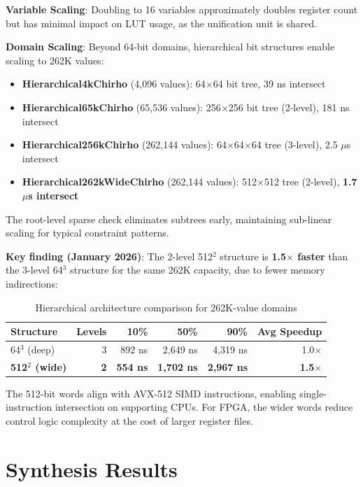 \documentclass[11pt,a4paper]{article}
\begin{document}
\textbf{Variable Scaling}: Doubling to 16 variables approximately doubles register
count but has minimal impact on LUT usage, as the unification unit is shared.

\textbf{Domain Scaling}: Beyond 64-bit domains, hierarchical bit structures enable scaling to 262K values:
\begin{itemize}
  \item \textbf{Hierarchical4kChirho} (4,096 values): 64$\times$64 bit tree, 39 ns intersect
  \item \textbf{Hierarchical65kChirho} (65,536 values): 256$\times$256 bit tree (2-level), 181 ns intersect
  \item \textbf{Hierarchical256kChirho} (262,144 values): 64$\times$64$\times$64 tree (3-level), 2.5 $\mu$s intersect
  \item \textbf{Hierarchical262kWideChirho} (262,144 values): 512$\times$512 tree (2-level), \textbf{1.7 $\mu$s intersect}
\end{itemize}
The root-level sparse check eliminates subtrees early, maintaining sub-linear scaling for typical constraint patterns.

\textbf{Key finding (January 2026)}: The 2-level 512$^2$ structure is \textbf{1.5$\times$ faster} than the 3-level 64$^3$ structure for the same 262K capacity, due to fewer memory indirections:

\begin{table}[H]
\centering
\caption{Hierarchical architecture comparison for 262K-value domains}
\label{tab:hierarchical_e_chirho}
\begin{tabular}{lrrrrr}
\toprule
\textbf{Structure} & \textbf{Levels} & \textbf{10\%} & \textbf{50\%} & \textbf{90\%} & \textbf{Avg Speedup} \\
\midrule
64$^3$ (deep) & 3 & 892 ns & 2,649 ns & 4,319 ns & 1.0$\times$ \\
\textbf{512$^2$ (wide)} & \textbf{2} & \textbf{554 ns} & \textbf{1,702 ns} & \textbf{2,967 ns} & \textbf{1.5$\times$} \\
\bottomrule
\end{tabular}
\end{table}

The 512-bit words align with AVX-512 SIMD instructions, enabling single-instruction intersection on supporting CPUs. For FPGA, the wider words reduce control logic complexity at the cost of larger register files.

\section{Synthesis Results}
\label{sec:synthesis_chirho}
\end{document}
